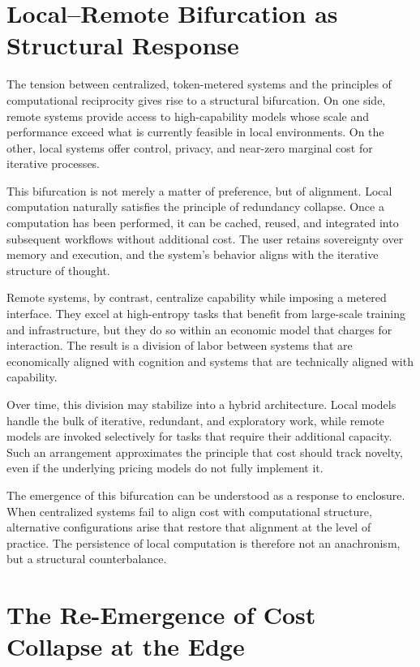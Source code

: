 \documentclass[12pt, oneside]{article}
\begin{document}
\section{Local--Remote Bifurcation as Structural Response}

The tension between centralized, token-metered systems and the principles of computational reciprocity gives rise to a structural bifurcation. On one side, remote systems provide access to high-capability models whose scale and performance exceed what is currently feasible in local environments. On the other, local systems offer control, privacy, and near-zero marginal cost for iterative processes.

This bifurcation is not merely a matter of preference, but of alignment. Local computation naturally satisfies the principle of redundancy collapse. Once a computation has been performed, it can be cached, reused, and integrated into subsequent workflows without additional cost. The user retains sovereignty over memory and execution, and the system's behavior aligns with the iterative structure of thought.

Remote systems, by contrast, centralize capability while imposing a metered interface. They excel at high-entropy tasks that benefit from large-scale training and infrastructure, but they do so within an economic model that charges for interaction. The result is a division of labor between systems that are economically aligned with cognition and systems that are technically aligned with capability.

Over time, this division may stabilize into a hybrid architecture. Local models handle the bulk of iterative, redundant, and exploratory work, while remote models are invoked selectively for tasks that require their additional capacity. Such an arrangement approximates the principle that cost should track novelty, even if the underlying pricing models do not fully implement it.

The emergence of this bifurcation can be understood as a response to enclosure. When centralized systems fail to align cost with computational structure, alternative configurations arise that restore that alignment at the level of practice. The persistence of local computation is therefore not an anachronism, but a structural counterbalance.

\section{The Re-Emergence of Cost Collapse at the Edge}
\end{document}
